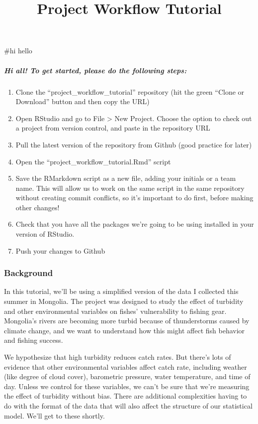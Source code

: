 \documentclass[]{article}
\title{Project Workflow Tutorial}
\author{}
\date{}
\providecommand{\tightlist}{%
  \setlength{\itemsep}{0pt}\setlength{\parskip}{0pt}}
\let\oldsubparagraph\subparagraph
\renewcommand{\subparagraph}[1]{\oldsubparagraph{#1}\mbox{}}
\begin{document}
\maketitle

\#hi hello

\hypertarget{hi-all-to-get-started-please-do-the-following-steps}{%
\subparagraph{Hi all! To get started, please do the following
steps:}\label{hi-all-to-get-started-please-do-the-following-steps}}

\begin{enumerate}
\def\labelenumi{\arabic{enumi}.}
\tightlist
\item
  Clone the ``project\_workflow\_tutorial'' repository (hit the green
  ``Clone or Download'' button and then copy the URL)
\item
  Open RStudio and go to File \textgreater{} New Project. Choose the
  option to check out a project from version control, and paste in the
  repository URL
\item
  Pull the latest version of the repository from Github (good practice
  for later)
\item
  Open the ``project\_workflow\_tutorial.Rmd'' script
\item
  Save the RMarkdown script as a new file, adding your initials or a
  team name. This will allow us to work on the same script in the same
  repository without creating commit conflicts, so it's important to do
  first, before making other changes!
\item
  Check that you have all the packages we're going to be using installed
  in your version of RStudio.
\item
  Push your changes to Github
\end{enumerate}

\hypertarget{background}{%
\subsubsection{Background}\label{background}}

In this tutorial, we'll be using a simplified version of the data I
collected this summer in Mongolia. The project was designed to study the
effect of turbidity and other environmental variables on fishes'
vulnerability to fishing gear. Mongolia's rivers are becoming more
turbid because of thunderstorms caused by climate change, and we want to
understand how this might affect fish behavior and fishing success.

We hypothesize that high turbidity reduces catch rates. But there's lots
of evidence that other environmental variables affect catch rate,
including weather (like degree of cloud cover), barometric pressure,
water temperature, and time of day. Unless we control for these
variables, we can't be sure that we're measuring the effect of turbidity
without bias. There are additional complexities having to do with the
format of the data that will also affect the structure of our
statistical model. We'll get to these shortly.
\end{document}
